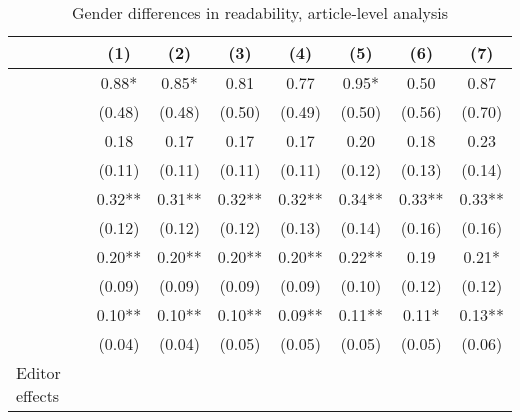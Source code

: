 \begin{table}
    \footnotesize
    \centering
    \begin{threeparttable}
        \caption{Gender differences in readability, article-level analysis}
        \label{table4}
        \begin{tabular}{p{2.64cm}S@{}S@{}S@{}S@{}S@{}S@{}S@{}}
            \toprule
            &{(1)}&{(2)}&{(3)}&{(4)}&{(5)}&{(6)}&{(7)}\\
            \midrule
            &        0.88*  &        0.85*  &        0.81   &        0.77   &        0.95*  &        0.50   &        0.87   \\
                                          &      (0.48)   &      (0.48)   &      (0.50)   &      (0.49)   &      (0.50)   &      (0.56)   &      (0.70)   \\
                &        0.18   &        0.17   &        0.17   &        0.17   &        0.20   &        0.18   &        0.23   \\
                                          &      (0.11)   &      (0.11)   &      (0.11)   &      (0.11)   &      (0.12)   &      (0.13)   &      (0.14)   \\
                   &        0.32** &        0.31** &        0.32** &        0.32** &        0.34** &        0.33** &        0.33** \\
                                          &      (0.12)   &      (0.12)   &      (0.12)   &      (0.13)   &      (0.14)   &      (0.16)   &      (0.16)   \\
                          &        0.20** &        0.20** &        0.20** &        0.20** &        0.22** &        0.19   &        0.21*  \\
                                          &      (0.09)   &      (0.09)   &      (0.09)   &      (0.09)   &      (0.10)   &      (0.12)   &      (0.12)   \\
                    &        0.10** &        0.10** &        0.10** &        0.09** &        0.11** &        0.11*  &        0.13** \\
                                          &      (0.04)   &      (0.04)   &      (0.05)   &      (0.05)   &      (0.05)   &      (0.05)   &      (0.06)   \\
            \midrule
            Editor effects                &           {}   &           {}   &           {}   &           {}   &           {}   &           {}   &           {}   \\

\end{tabular}
\end{threeparttable}
\end{table}
